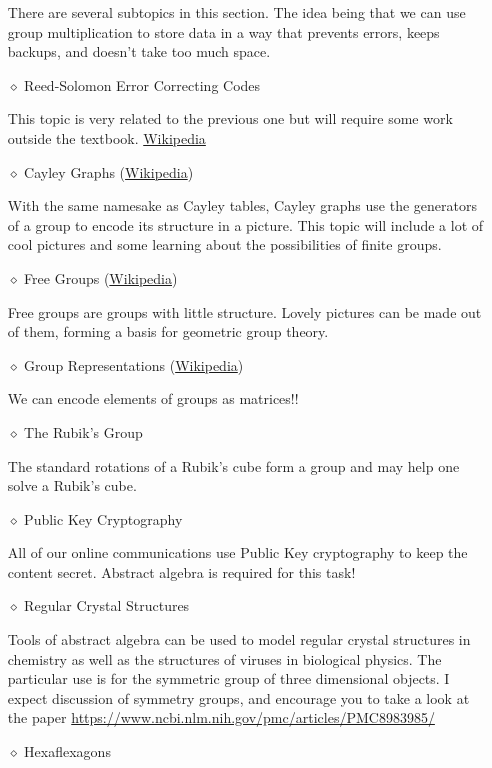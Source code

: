 \documentclass[12pt]{article}
\begin{document}
\begin{itemize}
				There are several subtopics in this section. The idea being that we can use group multiplication to store data in a way that prevents errors, keeps backups, and doesn't take too much space.  
		\item[$\diamond$] Reed-Solomon Error Correcting Codes
		
			This topic is very related to the previous one but will require some work outside the textbook.  \href{https://en.wikipedia.org/wiki/Reed%E2%80%93Solomon_error_corrections}{Wikipedia}
		\item[$\diamond$] Cayley Graphs (\href{https://en.wikipedia.org/wiki/Cayley_graph}{Wikipedia})
			
			With the same namesake as Cayley tables, Cayley graphs use the generators of a group to encode its structure in a picture. This topic will include a lot of cool pictures and some learning about the possibilities of finite groups.
		\item[$\diamond$] Free Groups (\href{https://en.wikipedia.org/wiki/Free_group}{Wikipedia})

			Free groups are groups with little structure. Lovely pictures can be made out of them, forming a basis for geometric group theory.		
		\item[$\diamond$] Group Representations (\href{https://en.wikipedia.org/wiki/Group_representation}{Wikipedia})

			We can encode elements of groups as matrices!!
		\item[$\diamond$] The Rubik's Group
		
			The standard rotations of a Rubik's cube form a group and may help one solve a Rubik's cube.
		
		\item[$\diamond$] Public Key Cryptography
		
			All of our online communications use Public Key cryptography to keep the content secret.  Abstract algebra is required for this task!
		\item[$\diamond$] Regular Crystal Structures	
		
			Tools of abstract algebra can be used to model regular crystal structures in chemistry as well as the structures of viruses in biological physics.  The particular use is for the symmetric group of three dimensional objects.  I expect discussion of symmetry groups, and encourage you to take a look at the paper \url{https://www.ncbi.nlm.nih.gov/pmc/articles/PMC8983985/}
		\item[$\diamond$] Hexaflexagons
		

\end{itemize}
\end{document}
